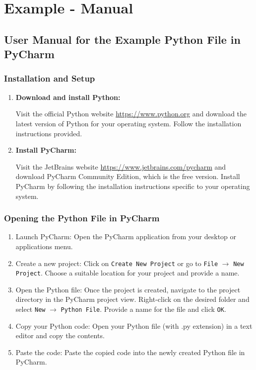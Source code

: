 \section{Example - Manual}

	\subsection{User Manual for the Example Python File in PyCharm}
	
		\subsubsection{Installation and Setup}
		
		\begin{enumerate}
			
			\item \textbf{Download and install Python:}
			
			 Visit the official Python website \url{https://www.python.org} and download the latest version of Python for your operating system. Follow the installation instructions provided.
			 
			\item \textbf{Install PyCharm: }
			
			Visit the JetBrains website \url{https://www.jetbrains.com/pycharm} and download PyCharm Community Edition, which is the free version. Install PyCharm by following the installation instructions specific to your operating system.
			
		\end{enumerate}

		\subsubsection{Opening the Python File in PyCharm}
		
		\begin{enumerate}
			
			\item Launch PyCharm: Open the PyCharm application from your desktop or applications menu.
			
			\item Create a new project: Click on \texttt{Create New Project} or go to \texttt{File} $\rightarrow$ \texttt{New Project}. Choose a suitable location for your project and provide a name.
			
			\item Open the Python file: Once the project is created, navigate to the project directory in the PyCharm project view. Right-click on the desired folder and select \texttt{New} $\rightarrow$ \texttt{Python File}. Provide a name for the file and click \texttt{OK}.
			
			\item Copy your Python code: Open your Python file (with .py extension) in a text editor and copy the contents.
			
			\item Paste the code: Paste the copied code into the newly created Python file in PyCharm.
			
		\end{enumerate}
	
